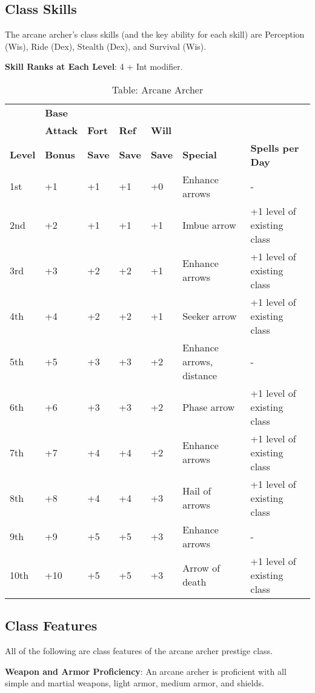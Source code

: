 \subsection{Class Skills}

				
The arcane archer's class skills (and the key ability for each skill) are Perception (Wis), Ride (Dex), Stealth (Dex), and Survival (Wis).
				
\textbf{Skill Ranks at Each Level}: 4 + Int modifier.

\begin{table}[]
\sffamily
\caption{Table: Arcane Archer}
\begin{tabular}{lllllll}
      & \textbf{Base} & & & & & \\ 
      & \textbf{Attack} & \textbf{Fort} & \textbf{Ref} & \textbf{Will} & & \\
\textbf{Level} & \textbf{Bonus }& \textbf{Save }&\textbf{ Save }& \textbf{Save }& \textbf{Special }& \textbf{Spells per Day}\\
1st & +1 & +1 & +1 & +0 & Enhance arrows & -\\
2nd & +2 & +1 & +1 & +1 & Imbue arrow & +1 level of existing class\\
3rd & +3 & +2 & +2 & +1 & Enhance arrows & +1 level of existing class\\
4th & +4 & +2 & +2 & +1 & Seeker arrow & +1 level of existing class\\
5th & +5 & +3 & +3 & +2 & Enhance arrows, distance & -\\
6th & +6 & +3 & +3 & +2 & Phase arrow & +1 level of existing class\\
7th & +7 & +4 & +4 & +2 & Enhance arrows & +1 level of existing class\\
8th & +8 & +4 & +4 & +3 & Hail of arrows & +1 level of existing class\\
9th & +9 & +5 & +5 & +3 & Enhance arrows & -\\
10th & +10 & +5 & +5 & +3 & Arrow of death & +1 level of existing class\\
\end{tabular}
\end{table}
				
\subsection{Class Features}

				
All of the following are class features of the arcane archer prestige class.
				
\textbf{Weapon and Armor Proficiency}: An arcane archer is proficient with all simple and martial weapons, light armor, medium armor, and shields.
				
